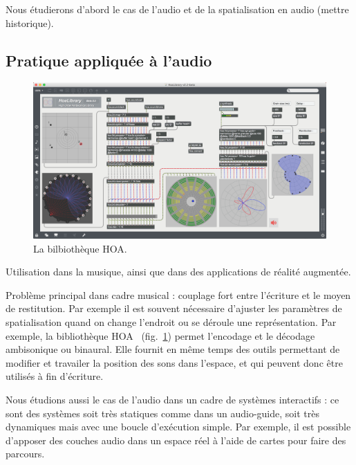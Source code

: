 \documentclass[french,12pt]{article}
\begin{document}
Nous étudierons d'abord le cas de l'audio et de la spatialisation en audio (mettre historique).

\subsection{Pratique appliquée à l'audio}
\begin{figure}[h]
    \centering
    \includegraphics[scale=0.25]{images/hoalibrary.png}
    \caption{La bilbiothèque HOA.}
    \label{fig.hoalib}
\end{figure}

Utilisation dans la musique, ainsi que dans des applications de réalité augmentée.

Problème principal dans cadre musical : couplage fort entre l'écriture et le moyen de restitution. Par exemple il est souvent nécessaire d'ajuster les paramètres de spatialisation quand on change l'endroit ou se déroule une représentation. %
Par exemple, la bibliothèque HOA~\cite{colafrancesco_bibliotheque_2013} (fig.~\ref{fig.hoalib}) permet l'encodage et le décodage ambisonique ou binaural. Elle fournit en même temps des outils permettant de modifier et travailer la position des sons dans l'espace, et qui peuvent donc être utilisés à fin d'écriture.

Nous étudions aussi le cas de l'audio dans un cadre de systèmes interactifs : ce sont des systèmes soit très statiques comme dans un audio-guide, soit très dynamiques mais avec une boucle d'exécution simple.
Par exemple, il est possible d'apposer des couches audio dans un espace réel à l'aide de cartes pour faire des parcours\cite{lemordant_augmented_2010}. 
\end{document}
